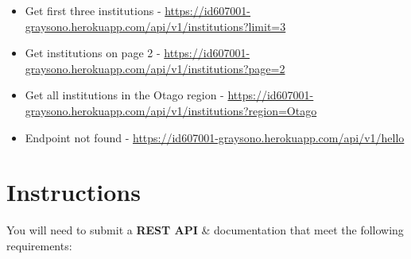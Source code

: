 \documentclass{article}
\begin{document}
\begin{itemize}
	\item Get first three institutions - \href{https://id607001-graysono.herokuapp.com/api/v1/institutions?limit=3}{https://id607001-graysono.herokuapp.com/api/v1/institutions?limit=3}
	\item Get institutions on page 2 - \href{https://id607001-graysono.herokuapp.com/api/v1/institutions?page=2}{https://id607001-graysono.herokuapp.com/api/v1/institutions?page=2}
	\item Get all institutions in the Otago region - \href{https://id607001-graysono.herokuapp.com/api/v1/institutions?region=Otago}{https://id607001-graysono.herokuapp.com/api/v1/institutions?region=Otago}
	\item Endpoint not found - \href{https://id607001-graysono.herokuapp.com/api/v1/hello}{https://id607001-graysono.herokuapp.com/api/v1/hello}
\end{itemize}

\section*{Instructions}
You will need to submit a \textbf{REST API} \& documentation that meet the following requirements:
\end{document}
